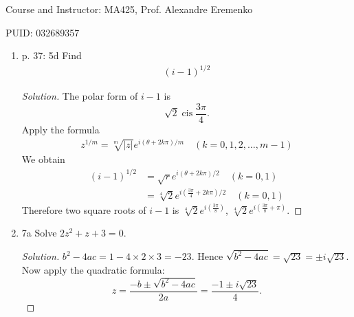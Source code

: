 
Course and Instructor: MA425, Prof. Alexandre Eremenko

PUID: 032689357
\begin{enumerate}
\item 
 p. 37: 5d Find \begin{align*}
(i-1)^{1 / 2}
\end{align*}
\begin{proof}[Solution]
	The polar form of $i - 1$ is \[
	\sqrt{2} \operatorname{cis} \frac{3 \pi}{4}
	.\] 
Apply the formula \begin{align*}
z^{1 / m}=\sqrt[m]{|z|} e^{i(\theta+2 k \pi) / m} \quad(k=0,1,2, \ldots, m-1)
\end{align*}
We obtain\begin{align*}
	\left( i - 1 \right) ^{1 / 2}&=
	\sqrt{r} e^{i(\theta+2 k \pi) / 2} \quad(k=0,1)\\
				     &= \sqrt[4]{2} e^{i(\frac{3 \pi}{4}+2 k \pi) / 2} \quad(k=0,1)
\end{align*}
Therefore two square roots of $i-1 $ is $\sqrt[4]{2} e^{i(\frac{3 \pi}{8}) }$, $\sqrt[4]{2} e^{i(\frac{3 \pi}{8}+  \pi) }$.

\end{proof}

\item 7a Solve $2 z^2+z+3=0$.
\begin{proof}[Solution]
	$b^2- 4ac = 1-4\times 2\times 3 = -23$. Hence $\sqrt{b^2-4ac}  = \sqrt{23}  = \pm i\sqrt{23} $.
	Now apply the quadratic formula: \[
	z=\frac{-b \pm \sqrt{b^2-4 a c}}{2 a}
	=\frac{-1 \pm i\sqrt{23}}{4}
	.\] 
\end{proof}



\end{enumerate}
